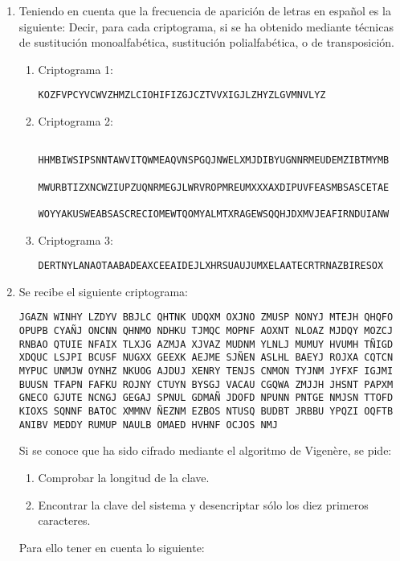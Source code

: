 \documentclass[]{book}
\theoremstyle{definition}
\begin{document}
\begin{enumerate}
\item Teniendo en cuenta que la frecuencia de aparición de letras en español es la siguiente: 
  Decir, para cada criptograma, si se ha obtenido mediante técnicas de sustitución monoalfabética, sustitución polialfabética, o de transposición. 
  \begin{enumerate}
    \item Criptograma 1:
      \begin{center}
        \verb+KOZFVPCYVCWVZHMZLCIOHIFIZGJCZTVVXIGJLZHYZLGVMNVLYZ+
      \end{center}
    \item Criptograma 2:
\begin{verbatim}
      HHMBIWSIPSNNTAWVITQWMEAQVNSPGQJNWELXMJDIBYUGNNRMEUDEMZIBTMYMB
      MWURBTIZXNCWZIUPZUQNRMEGJLWRVROPMREUMXXXAXDIPUVFEASMBSASCETAE
      WOYYAKUSWEABSASCRECIOMEWTQOMYALMTXRAGEWSQQHJDXMVJEAFIRNDUIANW
\end{verbatim}
    \item Criptograma 3:
      \begin{center}
        \verb+DERTNYLANAOTAABADEAXCEEAIDEJLXHRSUAUJUMXELAATECRTRNAZBIRESOX+
      \end{center}
\end{enumerate}
\item Se recibe el siguiente criptograma:
  
\begin{verbatim}
JGAZN WINHY LZDYV BBJLC QHTNK UDQXM OXJNO ZMUSP NONYJ MTEJH QHQFO 
OPUPB CYAÑJ ONCNN QHNMO NDHKU TJMQC MOPNF AOXNT NLOAZ MJDQY MOZCJ 
RNBAO QTUIE NFAIX TLXJG AZMJA XJVAZ MUDNM YLNLJ MUMUY HVUMH TÑIGD 
XDQUC LSJPI BCUSF NUGXX GEEXK AEJME SJÑEN ASLHL BAEYJ ROJXA CQTCN 
MYPUC UNMJW OYNHZ NKUOG AJDUJ XENRY TENJS CNMON TYJNM JYFXF IGJMI 
BUUSN TFAPN FAFKU ROJNY CTUYN BYSGJ VACAU CGQWA ZMJJH JHSNT PAPXM 
GNECO GJUTE NCNGJ GEGAJ SPNUL GDMAÑ JDOFD NPUNN PNTGE NMJSN TTOFD 
KIOXS SQNNF BATOC XMMNV ÑEZNM EZBOS NTUSQ BUDBT JRBBU YPQZI OQFTB
ANIBV MEDDY RUMUP NAULB OMAED HVHNF OCJOS NMJ
\end{verbatim}

Si se conoce que ha sido cifrado mediante el algoritmo de Vigenère, se pide: 
  \begin{enumerate}
    \item Comprobar la longitud de la clave. 
    \item Encontrar la clave del sistema y desencriptar sólo los diez primeros caracteres. 
  \end{enumerate}
Para ello tener en cuenta lo siguiente: 


\end{enumerate}
\end{document}
